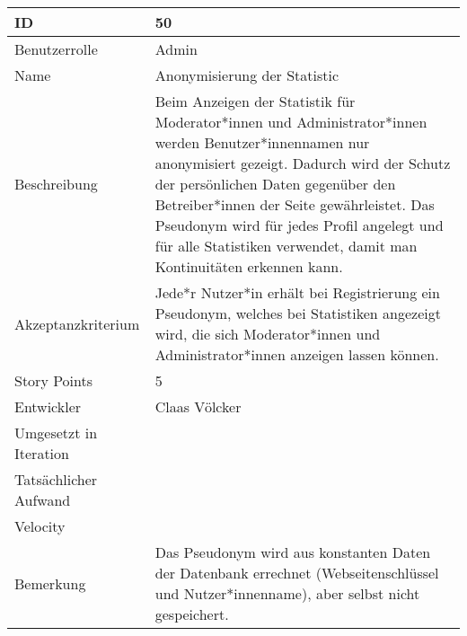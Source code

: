 \begin{tabularx}{\textwidth}{|p{}|X|}
	\hline
	ID & 50\\
	\hline
	Benutzerrolle & Admin\\
	\hline
	Name & Anonymisierung der Statistic\\
	\hline
	Beschreibung & Beim Anzeigen der Statistik für Moderator*innen und Administrator*innen werden Benutzer*innennamen nur anonymisiert gezeigt. Dadurch wird der Schutz der persönlichen Daten gegenüber den Betreiber*innen der Seite gewährleistet. Das Pseudonym wird für jedes Profil angelegt und für alle Statistiken verwendet, damit man Kontinuitäten erkennen kann.\\
	\hline
	Akzeptanzkriterium & Jede*r Nutzer*in erhält bei Registrierung ein Pseudonym, welches bei Statistiken angezeigt wird, die sich Moderator*innen und Administrator*innen anzeigen lassen können.\\
	\hline
	Story Points & 5\\
	\hline
	Entwickler & Claas Völcker\\
	\hline
	Umgesetzt in Iteration & \\
	\hline
	Tatsächlicher Aufwand & \\
	\hline
	Velocity & \\
	\hline
	Bemerkung & Das Pseudonym wird aus konstanten Daten der Datenbank errechnet (Webseitenschlüssel und Nutzer*innenname), aber selbst nicht gespeichert.\\
	\hline
\end{tabularx}
\vspace{20pt}
